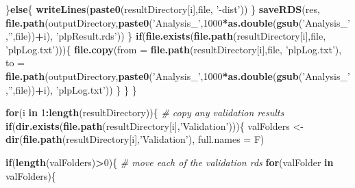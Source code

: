 \documentclass[
]{article}
\newenvironment{Shaded}{\begin{snugshade}}{\end{snugshade}}
\newcommand{\CommentTok}[1]{\textcolor[rgb]{0.56,0.35,0.01}{\textit{#1}}}
\newcommand{\ControlFlowTok}[1]{\textcolor[rgb]{0.13,0.29,0.53}{\textbf{#1}}}
\newcommand{\DataTypeTok}[1]{\textcolor[rgb]{0.13,0.29,0.53}{#1}}
\newcommand{\DecValTok}[1]{\textcolor[rgb]{0.00,0.00,0.81}{#1}}
\newcommand{\KeywordTok}[1]{\textcolor[rgb]{0.13,0.29,0.53}{\textbf{#1}}}
\newcommand{\NormalTok}[1]{#1}
\newcommand{\OperatorTok}[1]{\textcolor[rgb]{0.81,0.36,0.00}{\textbf{#1}}}
\newcommand{\StringTok}[1]{\textcolor[rgb]{0.31,0.60,0.02}{#1}}
\begin{document}
\begin{Shaded}
\begin{Highlighting}[]
\NormalTok{      \}}\ControlFlowTok{else}\NormalTok{\{}
        \KeywordTok{writeLines}\NormalTok{(}\KeywordTok{paste0}\NormalTok{(resultDirectory[i],file, }\StringTok{'-dist'}\NormalTok{))}
\NormalTok{      \}}
      \KeywordTok{saveRDS}\NormalTok{(res, }\KeywordTok{file.path}\NormalTok{(outputDirectory,}\KeywordTok{paste0}\NormalTok{(}\StringTok{'Analysis_'}\NormalTok{,}\DecValTok{1000}\OperatorTok{*}\KeywordTok{as.double}\NormalTok{(}\KeywordTok{gsub}\NormalTok{(}\StringTok{'Analysis_'}\NormalTok{,}\StringTok{''}\NormalTok{,file))}\OperatorTok{+}\NormalTok{i), }\StringTok{'plpResult.rds'}\NormalTok{))}
\NormalTok{    \}}
    \ControlFlowTok{if}\NormalTok{(}\KeywordTok{file.exists}\NormalTok{(}\KeywordTok{file.path}\NormalTok{(resultDirectory[i],file, }\StringTok{'plpLog.txt'}\NormalTok{)))\{}
      \KeywordTok{file.copy}\NormalTok{(}\DataTypeTok{from =} \KeywordTok{file.path}\NormalTok{(resultDirectory[i],file, }\StringTok{'plpLog.txt'}\NormalTok{), }
                \DataTypeTok{to =} \KeywordTok{file.path}\NormalTok{(outputDirectory,}\KeywordTok{paste0}\NormalTok{(}\StringTok{'Analysis_'}\NormalTok{,}\DecValTok{1000}\OperatorTok{*}\KeywordTok{as.double}\NormalTok{(}\KeywordTok{gsub}\NormalTok{(}\StringTok{'Analysis_'}\NormalTok{,}\StringTok{''}\NormalTok{,file))}\OperatorTok{+}\NormalTok{i), }\StringTok{'plpLog.txt'}\NormalTok{))}
\NormalTok{    \}}
\NormalTok{  \}}
\NormalTok{  \}}
  
  
  
  \ControlFlowTok{for}\NormalTok{(i }\ControlFlowTok{in} \DecValTok{1}\OperatorTok{:}\KeywordTok{length}\NormalTok{(resultDirectory))\{}
  \CommentTok{# copy any validation results}
  \ControlFlowTok{if}\NormalTok{(}\KeywordTok{dir.exists}\NormalTok{(}\KeywordTok{file.path}\NormalTok{(resultDirectory[i],}\StringTok{'Validation'}\NormalTok{)))\{}
\NormalTok{    valFolders <-}\StringTok{  }\KeywordTok{dir}\NormalTok{(}\KeywordTok{file.path}\NormalTok{(resultDirectory[i],}\StringTok{'Validation'}\NormalTok{), }\DataTypeTok{full.names =}\NormalTok{ F)}
    
    \ControlFlowTok{if}\NormalTok{(}\KeywordTok{length}\NormalTok{(valFolders)}\OperatorTok{>}\DecValTok{0}\NormalTok{)\{}
      \CommentTok{# move each of the validation rds}
      \ControlFlowTok{for}\NormalTok{(valFolder }\ControlFlowTok{in}\NormalTok{ valFolders)\{}
        

\end{Highlighting}
\end{Shaded}
\end{document}
